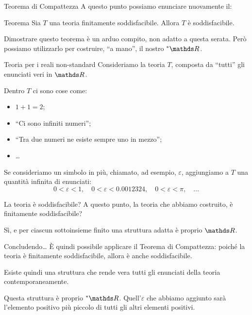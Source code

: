 \documentclass[babel]{beamer}
\begin{document}
\begin{frame}[label={sec:org6dd185a}]{Teorema di Compattezza}
A questo punto possiamo enunciare nuovamente il:
\begin{block}{Teorema}
Sia \(T\) una teoria finitamente soddisfacibile. Allora \(T\) è soddisfacibile.
\end{block}
Dimostrare questo teorema è un arduo compito, non adatto a questa serata. Però possiamo \alert{utilizzarlo} per costruire, ``a mano'', il nostro \(\null^{*} \R\).
\end{frame}
\begin{frame}[label={sec:orge137b2f}]{Teoria per i reali non-standard}
Consideriamo la teoria \(T\), composta da ``tutti'' gli \alert{enunciati veri in \(\R\)}.

Dentro \(T\) ci sono cose come:
\begin{itemize}
\item \(1+1=2\);
\item ``Ci sono infiniti numeri'';
\item ``Tra due numeri ne esiste sempre uno in mezzo'';
\item \ldots{}
\end{itemize}

Se consideriamo un simbolo in più, chiamato, ad esempio, \(\varepsilon\), aggiungiamo a \(T\) una quantità infinita di enunciati:
\begin{equation*}
0 < \varepsilon < 1, \quad 0 < \varepsilon < 0.0012324, \quad 0 < \varepsilon < \pi, \quad \dots
\end{equation*}
\end{frame}
\begin{frame}[label={sec:orgfb10bf5}]{La teoria è soddisfacibile?}
A questo punto, la teoria che abbiamo costruito, è finitamente soddisfacibile?

\alert{Sì}, e per ciascun sottoinsieme finito una struttura adatta è proprio \(\R\).
\end{frame}
\begin{frame}[label={sec:orgbaeda65}]{Concludendo\ldots{}}
È quindi possibile applicare il \alert{Teorema di Compattezza}: poiché la teoria è finitamente soddisfacibile, allora è anche \alert{soddisfacibile}.

Esiste quindi una struttura che rende vera \alert{tutti gli enunciati della teoria contemporaneamente}.

Questa struttura è proprio \(\null^{*} \R\). Quell'\(\varepsilon\) che abbiamo aggiunto sarà l'elemento positivo più piccolo di \alert{tutti gli altri elementi positivi}.
\end{frame}
\end{document}
